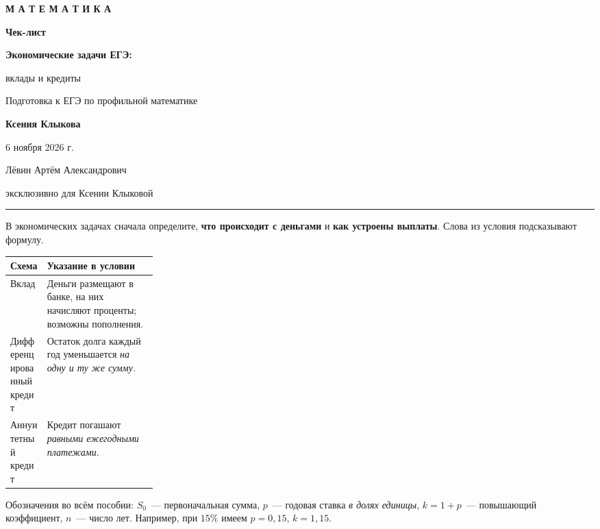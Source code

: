 \documentclass[a4paper,12pt]{article}
\newcommand{\key}[1]{\textcolor{darkaccent}{\textbf{#1}}}
\newcommand{\topic}[1]{\vspace{4mm}{\Large\textcolor{darkaccent}{\bfseries #1}}\par\vspace{1mm}\textcolor{rulegray}{\rule{\linewidth}{0.35pt}}\vspace{2mm}}
\begin{document}
\begin{titlepage}
\thispagestyle{empty}
\centering
\vspace*{11mm}
{\footnotesize\bfseries\textcolor{mutedgray}{М А Т Е М А Т И К А}}\par
\vspace{34mm}
{\fontsize{30}{35}\selectfont\bfseries\textcolor{darkaccent}{Чек-лист}}\par
\vspace{11mm}
{\fontsize{20}{26}\selectfont\bfseries Экономические задачи ЕГЭ:\par
 вклады и кредиты}\par
\vspace{11mm}
{\large Подготовка к ЕГЭ по профильной математике}\par
\vfill
{\Large\bfseries Ксения Клыкова}\par
\vspace{10mm}
{\large 6 ноября 2026 г.}\par
\vspace{24mm}
{\normalsize Лёвин Артём Александрович}\par
{\small эксклюзивно для Ксении Клыковой}\par
\vspace{8mm}
\vspace*{5mm}
\end{titlepage}

\topic{1. Как распознать финансовую схему}
В экономических задачах сначала определите, \key{что происходит с деньгами} и \key{как устроены выплаты}. Слова из условия подсказывают формулу.
\renewcommand{\arraystretch}{1.4}
\begin{center}
\small
\begin{tabularx}{\linewidth}{@{}p{0.25\linewidth}X@{}}
\toprule
\textbf{Схема} & \textbf{Указание в условии}\\
\midrule
Вклад & Деньги размещают в банке, на них начисляют проценты; возможны пополнения.\\
Дифференцированный кредит & Остаток долга каждый год уменьшается \emph{на одну и ту же сумму}.\\
Аннуитетный кредит & Кредит погашают \emph{равными ежегодными платежами}.\\
\bottomrule
\end{tabularx}
\end{center}
Обозначения во всём пособии: $S_0$~--- первоначальная сумма, $p$~--- годовая ставка \emph{в долях единицы}, $k=1+p$~--- повышающий коэффициент, $n$~--- число лет. Например, при $15\%$ имеем $p=0{,}15$, $k=1{,}15$.
\end{document}
